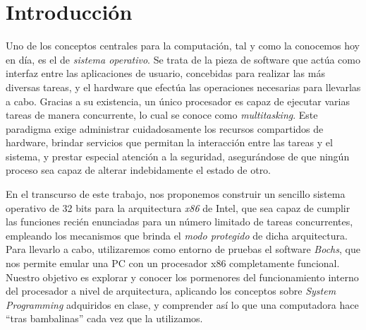 \section{Introducción}
  
  Uno de los conceptos centrales para la computación, tal y como la conocemos hoy en día, es el de \emph{sistema operativo}. Se trata de la pieza de software que actúa como interfaz entre las aplicaciones de usuario, concebidas para realizar las más diversas tareas, y el hardware que efectúa las operaciones necesarias para llevarlas a cabo. Gracias a su existencia, un único procesador es capaz de ejecutar varias tareas de manera concurrente, lo cual se conoce como \emph{multitasking}. Este paradigma exige administrar cuidadosamente los recursos compartidos de hardware, brindar servicios que permitan la interacción entre las tareas y el sistema, y prestar especial atención a la seguridad, asegurándose de que ningún proceso sea capaz de alterar indebidamente el estado de otro.
  
  En el transcurso de este trabajo, nos proponemos construir un sencillo sistema operativo de 32 bits para la arquitectura \emph{x86} de Intel, que sea capaz de cumplir las funciones recién enunciadas para un número limitado de tareas concurrentes, empleando los mecanismos que brinda el \emph{modo protegido} de dicha arquitectura. Para llevarlo a cabo, utilizaremos como entorno de pruebas el software \emph{Bochs}, que nos permite emular una PC con un procesador x86 completamente funcional. Nuestro objetivo es explorar y conocer los pormenores del funcionamiento interno del procesador a nivel de arquitectura, aplicando los conceptos sobre \emph{System Programming} adquiridos en clase, y comprender así lo que una computadora hace “tras bambalinas” cada vez que la utilizamos.
